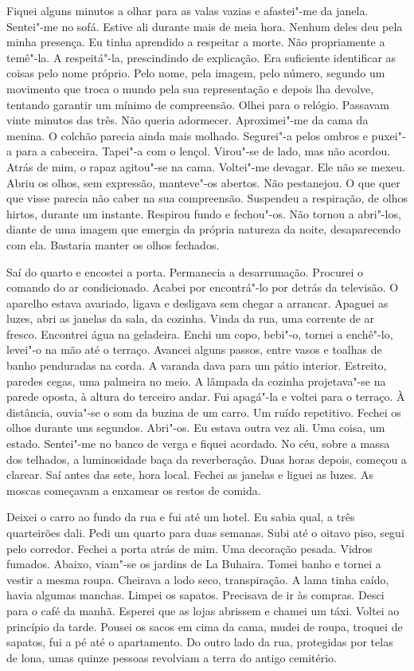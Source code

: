 Fiquei alguns minutos a olhar para as valas vazias e afastei"-me da
janela. Sentei"-me no sofá. Estive ali durante mais de meia hora. Nenhum
deles deu pela minha presença. Eu tinha aprendido a respeitar a morte.
Não propriamente a temê"-la. A respeitá"-la, prescindindo de explicação.
Era suficiente identificar as coisas pelo nome próprio. Pelo nome, pela
imagem, pelo número, segundo um movimento que troca o mundo pela sua
representação e depois lha devolve, tentando garantir um mínimo de
compreensão. Olhei para o relógio. Passavam vinte minutos das três. Não
queria adormecer. Aproximei"-me da cama da menina. O colchão parecia
ainda mais molhado. Segurei"-a pelos ombros e puxei"-a para a cabeceira.
Tapei"-a com o lençol. Virou"-se de lado, mas não acordou. Atrás de mim,
o rapaz agitou"-se na cama. Voltei"-me devagar. Ele não se mexeu. Abriu
os olhos, sem expressão, manteve"-os abertos. Não pestanejou. O que quer
que visse parecia não caber na sua compreensão. Suspendeu a respiração,
de olhos hirtos, durante um instante. Respirou fundo e fechou"-os. Não
tornou a abri"-los, diante de uma imagem que emergia da própria natureza
da noite, desaparecendo com ela. Bastaria manter os olhos fechados.

Saí do quarto e encostei a porta. Permanecia a desarrumação. Procurei o
comando do ar condicionado. Acabei por encontrá"-lo por detrás da
televisão. O aparelho estava avariado, ligava e desligava sem chegar a
arrancar. Apaguei as luzes, abri as janelas da sala, da cozinha. Vinda
da rua, uma corrente de ar fresco. Encontrei água na geladeira. Enchi
um copo, bebi"-o, tornei a enchê"-lo, levei"-o na mão até o terraço.
Avancei alguns passos, entre vasos e toalhas de banho penduradas na
corda. A varanda dava para um pátio interior. Estreito, paredes cegas,
uma palmeira no meio. A lâmpada da cozinha projetava"-se na parede
oposta, à altura do terceiro andar. Fui apagá"-la e voltei para o
terraço. À distância, ouvia"-se o som da buzina de um carro. Um ruído
repetitivo. Fechei os olhos durante uns segundos. Abri"-os. Eu estava
outra vez ali. Uma coisa, um estado. Sentei"-me no banco de verga e
fiquei acordado. No céu, sobre a massa dos telhados, a luminosidade baça
da reverberação. Duas horas depois, começou a clarear. Saí antes das
sete, hora local. Fechei as janelas e liguei as luzes. As moscas
começavam a enxamear os restos de comida.

Deixei o carro ao fundo da rua e fui até um hotel. Eu sabia qual, a três
quarteirões dali. Pedi um quarto para duas semanas. Subi até o oitavo
piso, segui pelo corredor. Fechei a porta atrás de mim. Uma decoração
pesada. Vidros fumados. Abaixo, viam"-se os jardins de La Buhaira. Tomei
banho e tornei a vestir a mesma roupa. Cheirava a lodo seco,
transpiração. A lama tinha caído, havia algumas manchas. Limpei os
sapatos. Precisava de ir às compras. Desci para o café da manhã.
Esperei que as lojas abrissem e chamei um táxi. Voltei ao princípio da
tarde. Pousei os sacos em cima da cama, mudei de roupa, troquei de
sapatos, fui a pé até o apartamento. Do outro lado da rua, protegidas
por telas de lona, umas quinze pessoas revolviam a terra do antigo
cemitério.

